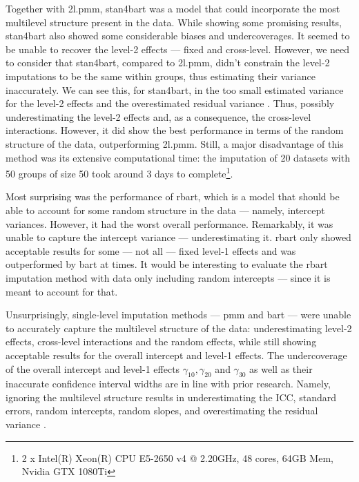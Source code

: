 \documentclass[3p,12pt,a4paper]{elsarticle}
\begin{document}
Together with 2l.pmm, stan4bart was a model that could incorporate the most multilevel structure present in the data. While showing some promising results, stan4bart also showed some considerable biases and undercoverages. It seemed to be unable to recover the level-2 effects --- fixed and cross-level. However, we need to consider that stan4bart, compared to 2l.pmm, didn't constrain the level-2 imputations to be the same within groups, thus estimating their variance inaccurately. We can see this, for stan4bart, in the too small estimated variance for the level-2 effects and the overestimated residual variance \citep{buurenFlexibleImputationMissing2018}. Thus, possibly underestimating the level-2 effects and, as a consequence, the cross-level interactions. %
However, it did show the best performance in terms of the random structure of the data, outperforming 2l.pmm. %
Still, a major disadvantage of this method was its extensive computational time: the imputation of 20 datasets with 50 groups of size 50 took around 3 days to complete\footnote{2 x Intel(R) Xeon(R) CPU E5-2650 v4 @ 2.20GHz, 48 cores, 64GB Mem, Nvidia GTX 1080Ti}. %

Most surprising was the performance of rbart, which is a model that should be able to account for some random structure in the data --- namely, intercept variances. However, it had the worst overall performance. Remarkably, it was unable to capture the intercept variance --- underestimating it. rbart only showed acceptable results for some --- not all --- fixed level-1 effects and was outperformed by bart at times. It would be interesting to evaluate the rbart imputation method with data only including random intercepts --- since it is meant to account for that.

Unsurprisingly, single-level imputation methods --- pmm and bart --- were unable to accurately capture the multilevel structure of the data: underestimating level-2 effects, cross-level interactions and the random effects, while still showing acceptable results for the overall intercept and level-1 effects. The undercoverage of the overall intercept and level-1 effects $\gamma_{10}, \gamma_{20}$ and $\gamma_{30}$ as well as their inaccurate confidence interval widths are in line with prior research. Namely, ignoring the multilevel structure results in underestimating the ICC, standard errors, random intercepts, random slopes, and overestimating the residual variance \citep{buurenFlexibleImputationMissing2018, ludtke2017, taljaard2008, hox2011,enders2016}.
\end{document}
